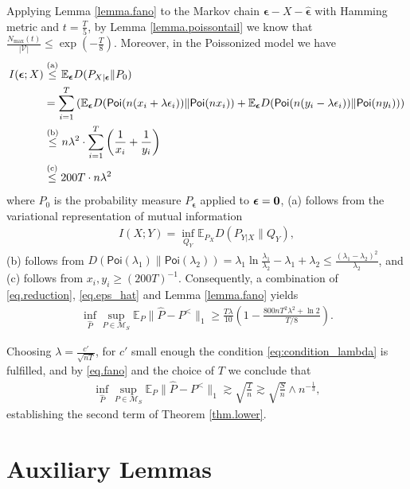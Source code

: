 \documentclass[final,12pt]{colt2018} %
\def \bP {\mathbb{P}}
\def \bE {\mathbb{E}}
\def \spo {\mathsf{Poi}}
\newcommand{\calM}{{\mathcal{M}}}
\newcommand{\calV}{{\mathcal{V}}}
\newcommand{\stepa}[1]{\overset{\rm (a)}{#1}}
\newcommand{\stepb}[1]{\overset{\rm (b)}{#1}}
\newcommand{\stepc}[1]{\overset{\rm (c)}{#1}}
\begin{document}
Applying Lemma \ref{lemma.fano} to the Markov chain $\bm{\epsilon}-X-\hat{\bm{\epsilon}}$ with Hamming metric and $t=\frac{T}{5}$, by Lemma \ref{lemma.poissontail} we know that $\frac{N_{\max}(t)}{|\calV|}\le \exp(-\frac{T}{8})$. Moreover, in the Poissonized model we have
\begin{align*}
I(\bm{\epsilon};X) &\stepa \le \bE_{\bm{\epsilon}} D(P_{X|\bm{\epsilon}}\|P_0) \\
&= \sum_{i=1}^T \left(\bE_{\bm{\epsilon}} D(\spo(n(x_i+\lambda\epsilon_i)) \|\spo(nx_i) ) + \bE_{\bm{\epsilon}} D(\spo(n(y_i-\lambda\epsilon_i)) \|\spo(ny_i) )\right) \\
&\stepb \le n\lambda^2\cdot \sum_{i=1}^T \left(\frac{1}{x_i} + \frac{1}{y_i}\right) \\
&\stepc \le 200T\cdot n\lambda^2
\end{align*}
where $P_0$ is the probability measure $P_{\bm{\epsilon}}$ applied to $\bm{\epsilon}={\bf 0}$, (a) follows from the variational representation of mutual information
\begin{align*}
I(X;Y) = \inf_{Q_Y} \bE_{P_X} D(P_{Y|X}\|Q_Y), 
\end{align*}
(b) follows from $D(\spo(\lambda_1)\|\spo(\lambda_2))=\lambda_1\ln\frac{\lambda_1}{\lambda_2}-\lambda_1+\lambda_2\le \frac{(\lambda_1-\lambda_2)^2}{\lambda_2}$, and (c) follows from $x_i, y_i\ge (200T)^{-1}$. Consequently, a combination of \eqref{eq.reduction}, \eqref{eq.eps_hat} and Lemma \ref{lemma.fano} yields
\begin{align}\label{eq.fano}
\inf_{\hat{P}}\sup_{P\in \calM_S} \bE_P\|\hat{P}-P^<\|_1 \ge \frac{T\lambda}{10}\left(1-\frac{800nT^2\lambda^2+\ln 2}{T/8}\right).
\end{align}

Choosing $\lambda=\frac{c'}{\sqrt{nT}}$, for $c'$ small enough the condition \eqref{eq:condition_lambda} is fulfilled, and by \eqref{eq.fano} and the choice of $T$ we conclude that
\begin{align*}
\inf_{\hat{P}}\sup_{P\in \calM_S} \bE_P\|\hat{P}-P^<\|_1 \gtrsim \sqrt{\frac{T}{n}} \gtrsim \sqrt{\frac{S}{n}}\wedge n^{-\frac{1}{3}},
\end{align*}
establishing the second term of Theorem \ref{thm.lower}.


\section{Auxiliary Lemmas}
\end{document}

